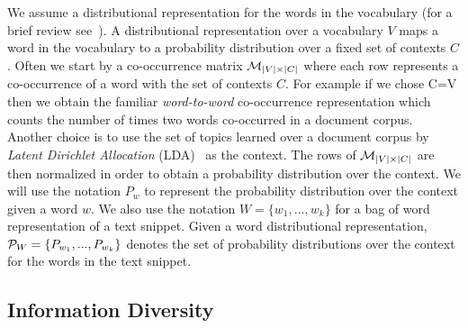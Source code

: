 \documentclass{article}
\begin{document}

We assume a distributional representation for the words in the vocabulary (for a brief review
see~\cite{Turian10wordrepresentations}). A distributional representation over a vocabulary $V$ maps a word in the vocabulary to a 
probability distribution over a fixed set of contexts $C$. Often we start by a co-occurrence matrix ${\mathcal M}_{|V|\times|C|}$ where each row represents a co-occurrence of a word with the set of contexts
$C$. For example if we chose C=V then we obtain the familiar {\sl word-to-word} co-occurrence representation which counts the number
of times two words co-occurred in a document corpus. Another choice is to use the set of topics learned over a document
corpus by {\sl Latent Dirichlet Allocation} (LDA)~\cite{Blei:2003:LDA:944919.944937} as the context. The rows of ${\mathcal M}_{|V|\times|C|}$
are then normalized in order to obtain a probability distribution over the context. We will use the notation $P_w$ to represent
the probability distribution over the context  given a word $w$. We also use the notation $W=\{w_1,...,w_k\}$ for a bag of word representation of a text snippet. Given a word distributional representation, ${\mathcal P}_{W}=\{P_{w_1},...,P_{w_k}\}$ denotes the set of probability distributions over the context for the words
in the text snippet.


\subsection{Information Diversity}
\label{sec:information-diversity}
\end{document}
